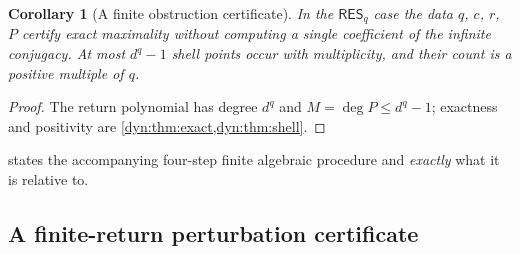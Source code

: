 \documentclass[11pt,letterpaper]{article}
\newtheorem{corollary}[corollary]{Corollary}
\theoremstyle{definition}
\theoremstyle{remark}
\newcommand{\resq}{\mathsf{RES}_q}
\numberwithin{equation}{section}
\begin{document}
\begin{corollary}[A finite obstruction certificate]\label{dyn:cor:finite-certificate}
In the $\resq$ case the data $q$, $c$, $r$, $P$ certify exact maximality
without computing a single coefficient of the infinite conjugacy. At most
$d^{q}-1$ shell points occur with multiplicity, and their count is a
positive multiple of $q$.
\end{corollary}
\begin{proof}
The return polynomial has degree $d^{q}$ and $M=\deg P\le d^{q}-1$;
exactness and positivity are \cref{dyn:thm:exact,dyn:thm:shell}.
\end{proof}

 states the accompanying four-step finite
algebraic procedure and \emph{exactly} what it is relative to.

\subsection{A finite-return perturbation certificate}
\end{document}
